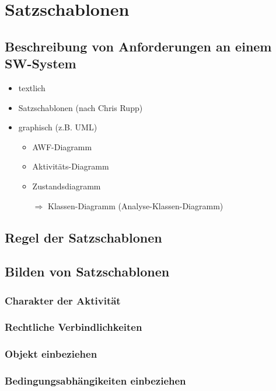 \section{Satzschablonen}
\subsection{Beschreibung von Anforderungen an einem SW-System}
\begin{itemize}
\item textlich
\item Satzschablonen (nach Chris Rupp)
\item graphisch (z.B. UML)
\begin{itemize}
\item AWF-Diagramm
\item Aktivitäts-Diagramm
\item Zustandsdiagramm
\item[$\Rightarrow$] Klassen-Diagramm (Analyse-Klassen-Diagramm)
\end{itemize}
\end{itemize}

\subsection{Regel der Satzschablonen}

\subsection{Bilden von Satzschablonen}

\subsubsection{Charakter der Aktivität}

\subsubsection{Rechtliche Verbindlichkeiten}

\subsubsection{Objekt einbeziehen}

\subsubsection{Bedingungsabhängikeiten einbeziehen}



